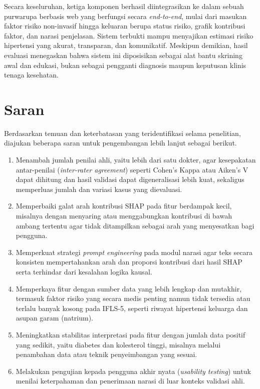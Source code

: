 Secara keseluruhan, ketiga komponen berhasil diintegrasikan ke dalam sebuah purwarupa berbasis web yang berfungsi secara \textit{end-to-end}, mulai dari masukan faktor risiko non-invasif hingga keluaran berupa status risiko, grafik kontribusi faktor, dan narasi penjelasan. Sistem terbukti mampu menyajikan estimasi risiko hipertensi yang akurat, transparan, dan komunikatif. Meskipun demikian, hasil evaluasi menegaskan bahwa sistem ini diposisikan sebagai alat bantu skrining awal dan edukasi, bukan sebagai pengganti diagnosis maupun keputusan klinis tenaga kesehatan.

\section{Saran}
Berdasarkan temuan dan keterbatasan yang teridentifikasi selama penelitian, diajukan beberapa saran untuk pengembangan lebih lanjut sebagai berikut.

\begin{enumerate}
    \item Menambah jumlah penilai ahli, yaitu lebih dari satu dokter, agar kesepakatan antar-penilai (\textit{inter-rater agreement}) seperti Cohen's Kappa atau Aiken's V dapat dihitung dan hasil validasi dapat digeneralisasi lebih kuat, sekaligus memperluas jumlah dan variasi kasus yang dievaluasi.

    \item Memperbaiki galat arah kontribusi SHAP pada fitur berdampak kecil, misalnya dengan menyaring atau menggabungkan kontribusi di bawah ambang tertentu agar tidak ditampilkan sebagai arah yang menyesatkan bagi pengguna.

    \item Memperkuat strategi \textit{prompt engineering} pada modul narasi agar teks secara konsisten mempertahankan arah dan proporsi kontribusi dari hasil SHAP serta terhindar dari kesalahan logika kausal.

    \item Memperkaya fitur dengan sumber data yang lebih lengkap dan mutakhir, termasuk faktor risiko yang secara medis penting namun tidak tersedia atau terlalu banyak kosong pada IFLS-5, seperti riwayat hipertensi keluarga dan asupan garam (natrium).

    \item Meningkatkan stabilitas interpretasi pada fitur dengan jumlah data positif yang sedikit, yaitu diabetes dan kolesterol tinggi, misalnya melalui penambahan data atau teknik penyeimbangan yang sesuai.

    \item Melakukan pengujian kepada pengguna akhir nyata (\textit{usability testing}) untuk menilai keterpahaman dan penerimaan narasi di luar konteks validasi ahli.
\end{enumerate}
